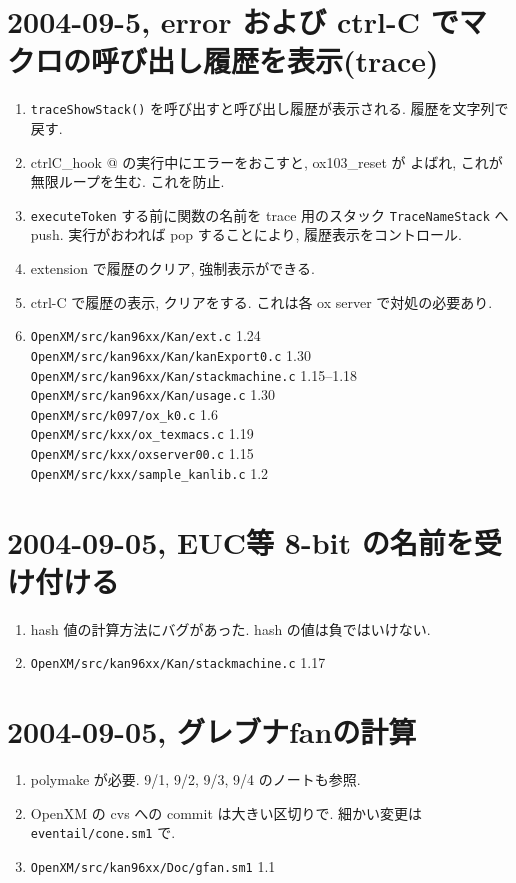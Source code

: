 \documentclass{jarticle}
\begin{document}
\section{2004-09-5, error および ctrl-C でマクロの呼び出し履歴を表示(trace)}
\begin{enumerate}
\item {\tt traceShowStack()} を呼び出すと呼び出し履歴が表示される.
履歴を文字列で戻す.
\item \verb@ ctrlC_hook @ の実行中にエラーをおこすと, ox103\_reset が
よばれ, これが無限ループを生む. これを防止.
\item {\tt executeToken} する前に関数の名前を trace 用のスタック
{\tt TraceNameStack} へ push.
実行がおわれば pop することにより, 履歴表示をコントロール.
\item extension で履歴のクリア, 強制表示ができる.
\item ctrl-C で履歴の表示, クリアをする. これは各 ox server で対処の必要あり.
\item 
{\tt OpenXM/src/kan96xx/Kan/ext.c} 1.24 \\
{\tt OpenXM/src/kan96xx/Kan/kanExport0.c} 1.30 \\
{\tt OpenXM/src/kan96xx/Kan/stackmachine.c} 1.15--1.18  \\
{\tt OpenXM/src/kan96xx/Kan/usage.c} 1.30 \\
{\tt OpenXM/src/k097/ox\_k0.c} 1.6 \\
{\tt OpenXM/src/kxx/ox\_texmacs.c} 1.19 \\
{\tt OpenXM/src/kxx/oxserver00.c} 1.15 \\
{\tt OpenXM/src/kxx/sample\_kanlib.c} 1.2
\end{enumerate}

\section{2004-09-05, EUC等 8-bit の名前を受け付ける}
\begin{enumerate}
\item hash 値の計算方法にバグがあった. hash の値は負ではいけない.
\item {\tt OpenXM/src/kan96xx/Kan/stackmachine.c} 1.17
\end{enumerate}


\section{2004-09-05, グレブナfanの計算}
\begin{enumerate}
\item polymake が必要.  9/1, 9/2, 9/3, 9/4 のノートも参照.
\item OpenXM の cvs への commit は大きい区切りで. 
      細かい変更は {\tt eventail/cone.sm1} で.
\item {\tt OpenXM/src/kan96xx/Doc/gfan.sm1} 1.1
\end{enumerate}
\end{document}
